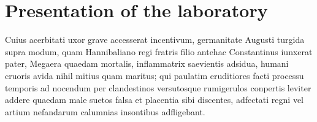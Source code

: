 \chapter{Presentation of the laboratory}

Cuius acerbitati uxor grave accesserat incentivum, germanitate Augusti
turgida supra modum, quam Hannibaliano regi fratris filio antehac
Constantinus iunxerat pater, Megaera quaedam mortalis, inflammatrix
saevientis adsidua, humani cruoris avida nihil mitius quam maritus;
qui paulatim eruditiores facti processu temporis ad nocendum per
clandestinos versutosque rumigerulos conpertis leviter addere quaedam
male suetos falsa et placentia sibi discentes, adfectati regni vel
artium nefandarum calumnias insontibus adfligebant.
